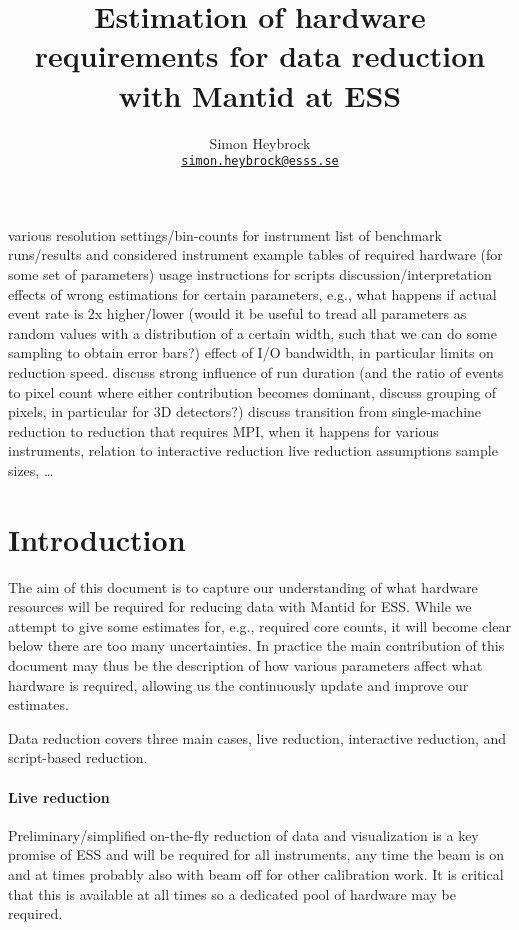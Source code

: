 \documentclass[a4paper,english,numbers=noenddot,bibliography=totoc,chapterprefix=on,DIV=12]{scrartcl}
\begin{document}
\title{Estimation of hardware requirements for data reduction with Mantid at ESS}
\author{Simon Heybrock\\
    {\small\href{mailto:simon.heybrock@esss.se}{\nolinkurl{simon.heybrock@esss.se}}}}

\maketitle

\tableofcontents

various resolution settings/bin-counts for instrument
list of benchmark runs/results and considered instrument
example tables of required hardware (for some set of parameters)
usage instructions for scripts
discussion/interpretation
effects of wrong estimations for certain parameters, e.g., what happens if actual event rate is 2x higher/lower (would it be useful to tread all parameters as random values with a distribution of a certain width, such that we can do some sampling to obtain error bars?)
effect of I/O bandwidth, in particular limits on reduction speed.
discuss strong influence of run duration (and the ratio of events to pixel count where either contribution becomes dominant, discuss grouping of pixels, in particular for 3D detectors?)
discuss transition from single-machine reduction to reduction that requires MPI, when it happens for various instruments, relation to interactive reduction
live reduction
assumptions
sample sizes, \dots

\section{Introduction}

The aim of this document is to capture our understanding of what hardware resources will be required for reducing data with Mantid for ESS.
While we attempt to give some estimates for, e.g., required core counts, it will become clear below there are too many uncertainties. In practice the main contribution of this document may thus be the description of how various parameters affect what hardware is required, allowing us the continuously update and improve our estimates.

Data reduction covers three main cases, live reduction, interactive reduction, and script-based reduction.

\paragraph{Live reduction}
Preliminary/simplified on-the-fly reduction of data and visualization is a key promise of ESS and will be required for all instruments, any time the beam is on and at times probably also with beam off for other calibration work.
It is critical that this is available at all times so a dedicated pool of hardware may be required.
\end{document}
